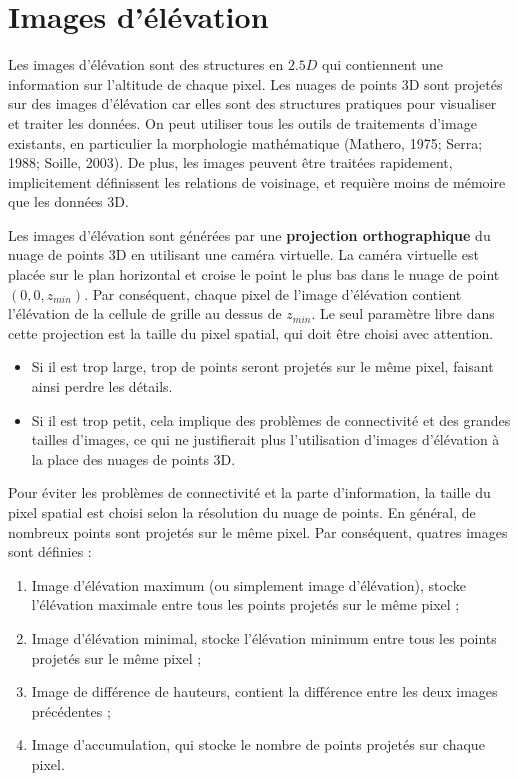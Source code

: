 \section{Images d'élévation}

Les images d’élévation sont des structures en $2.5D$ qui contiennent une information sur l’altitude de chaque pixel. Les nuages de points 3D sont projetés sur des images d’élévation car elles sont des structures pratiques pour visualiser et traiter les données. On peut utiliser tous les outils de traitements d’image existants, en particulier la morphologie mathématique (Mathero, 1975; Serra; 1988; Soille, 2003). De plus, les images peuvent être traitées rapidement, implicitement définissent les relations de voisinage, et requière moins de mémoire que les données 3D.

Les images d’élévation sont générées par une \textbf{projection orthographique} du nuage de points 3D en utilisant une caméra virtuelle. La caméra virtuelle est placée sur le plan horizontal et croise le point le plus bas dans le nuage de point $(0, 0, z_{min})$. Par conséquent, chaque pixel de l’image d’élévation contient l’élévation de la cellule de grille au dessus de $z_{min}$. Le seul paramètre libre dans cette projection est la taille du pixel spatial, qui doit être choisi avec attention. 
\begin{itemize}
\item Si il est trop large, trop de points seront projetés sur le même pixel, faisant ainsi perdre les détails. 
\item Si il est trop petit, cela implique des problèmes de connectivité et des grandes tailles d’images, ce qui ne justifierait plus l’utilisation d’images d’élévation à la place des nuages de points 3D. 
\end{itemize}

\vspace{1em}

Pour éviter les problèmes de connectivité et la parte d’information, la taille du pixel spatial est choisi selon la résolution du nuage de points.
En général, de nombreux points sont projetés sur le même pixel. Par conséquent, quatres images sont définies :

\begin{enumerate}
\item Image d’élévation maximum (ou simplement image d’élévation), stocke l’élévation maximale entre tous les points projetés sur le même pixel ;
\item Image d’élévation minimal, stocke l’élévation minimum entre tous les points projetés sur le même pixel ;
\item Image de différence de hauteurs, contient la différence entre les deux images précédentes ;
\item Image d’accumulation, qui stocke le nombre de points projetés sur chaque pixel.
\end{enumerate}

